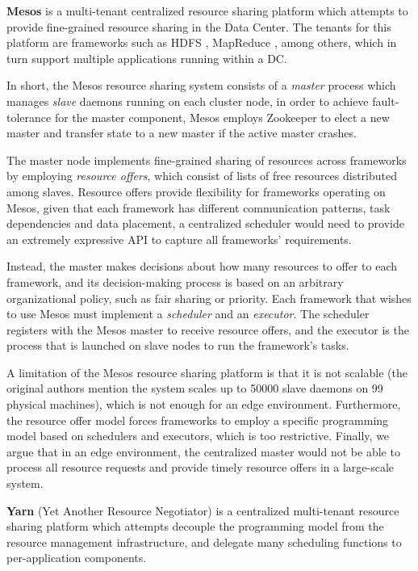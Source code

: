 \textbf{Mesos} \cite{hindman2011mesos} is a multi-tenant centralized resource sharing platform which attempts to provide fine-grained resource sharing in the Data Center. The tenants for this platform are frameworks such as HDFS \cite{borthakur2008hdfs}, MapReduce \cite{dean2008mapreduce}, among others, which in turn support multiple applications running within a DC.

In short, the Mesos resource sharing system consists of a \textit{master} process which manages \textit{slave} daemons running on each cluster node, in order to achieve fault-tolerance for the master component, Mesos employs Zookeeper \cite{hunt2010zookeeper} to elect a new master and transfer state to a new master if the active master crashes.

The master node implements fine-grained sharing of resources across frameworks by employing \textit{resource offers}, which consist of lists of free resources distributed among slaves. Resource offers provide flexibility for frameworks operating on Mesos, given that each framework has different communication patterns, task dependencies and data placement, a centralized scheduler would need to provide an extremely expressive API to capture all frameworks' requirements. 

Instead, the master makes decisions about how many resources to offer to each framework, and its decision-making process is based on an arbitrary organizational policy, such as fair sharing or priority. Each framework that wishes to use Mesos must implement a \textit{scheduler} and an \textit{executor}. The scheduler registers with the Mesos master to receive resource offers, and the executor is the process that is launched on slave nodes to run the framework's tasks.

A limitation of the Mesos resource sharing platform is that it is not scalable (the original authors mention the system scales up to 50000 slave daemons on 99 physical machines), which is not enough for an edge environment. Furthermore, the resource offer model forces frameworks to employ a specific programming model based on schedulers and executors, which is too restrictive. Finally, we argue that in an edge environment, the centralized master would not be able to process all resource requests and provide timely resource offers in a large-scale system.

\textbf{Yarn} (Yet Another Resource Negotiator) \cite{Vavilapalli2013ApacheHY} is a centralized multi-tenant resource sharing platform which attempts decouple the programming model from the resource management infrastructure, and delegate many scheduling functions to per-application components. 

